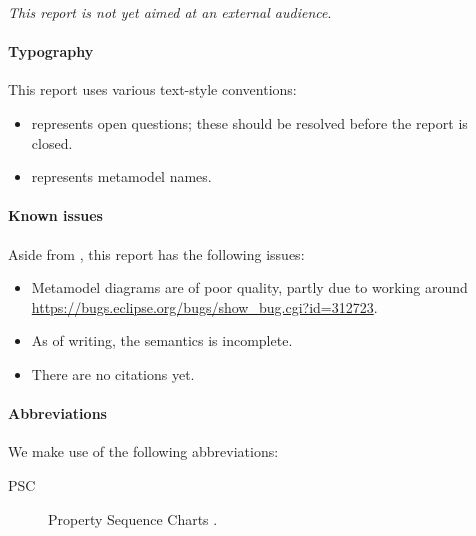 
\emph{This report is not yet aimed at an external audience}.

\paragraph{Typography}
This report uses various text-style conventions:

\begin{itemize}
\item
	 represents open questions; these should be
	resolved before the report is closed.
\item
	 represents metamodel names.
\end{itemize}

\paragraph{Known issues}
Aside from , this report has the following issues:

\begin{itemize}
\item
	Metamodel diagrams are of poor quality, partly due to working around
	\url{https://bugs.eclipse.org/bugs/show_bug.cgi?id=312723}.
\item
	As of writing, the semantics is incomplete.
\item
	There are no citations yet.	
\end{itemize}

\paragraph{Abbreviations} We make use of the following abbreviations:

\begin{description}
	\item[PSC] Property Sequence Charts .
\end{description}
